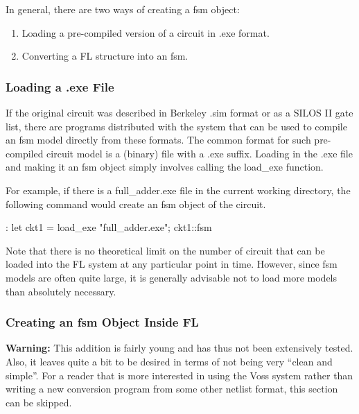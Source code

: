 In general, there are two ways of creating a fsm object:
\begin{enumerate}
\item
Loading a pre-compiled version of a circuit in .exe format.
\item
Converting a FL structure into an fsm.
\end{enumerate}

\subsubsection{Loading a .exe File}

If the original circuit was described in Berkeley .sim format or
as a SILOS II gate list, there are programs distributed with the
system that can be used to compile an fsm model directly from
these formats.
The common format for such pre-compiled circuit model is a (binary)
file with a .exe suffix.
Loading in the .exe file and making it an fsm object simply
involves calling the load\_exe function.

For example, if there is a full\_adder.exe file in the current
working directory, the following command would create an fsm object
of the circuit.
\begin{hol}
: let ckt1 = load_exe "full_adder.exe";
ckt1::fsm
\end{hol}
Note that there is no theoretical limit on the number of circuit that can
be loaded into the FL system at any particular point in time.
However, since fsm models are often quite large, it is generally
advisable not to load more models than absolutely necessary.

\subsubsection{Creating an fsm Object Inside FL}

{\bf Warning:} This addition is fairly young and has thus not
been extensively tested. Also, it leaves quite a bit to
be desired in terms of not being very ``clean and simple''.
For a reader that is more interested in using the Voss system rather
than writing a new conversion program from some other netlist format, this
section can be skipped.

